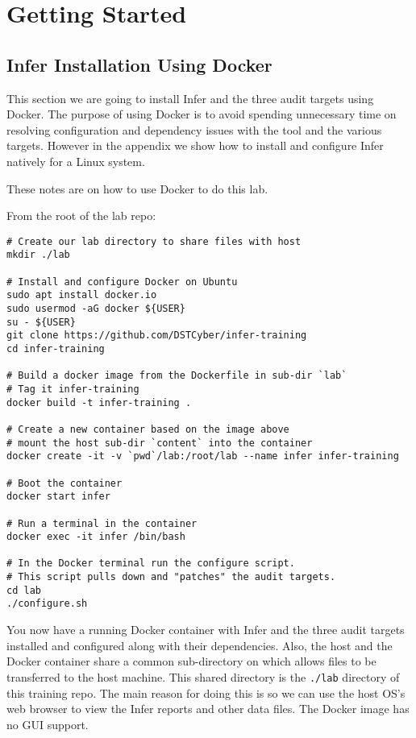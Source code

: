 \section{Getting Started}

\subsection{Infer Installation Using Docker}

This section we are going to install Infer and the three audit targets
using Docker.
The purpose of using Docker is to avoid spending unnecessary time 
on resolving configuration and dependency issues with the tool and 
the various targets.
However in the appendix we show how to install and configure Infer 
natively for a Linux system.

These notes are on how to use Docker to do this lab. 



\noindent From the root of the lab repo: 

\begin{verbatim}
# Create our lab directory to share files with host
mkdir ./lab

# Install and configure Docker on Ubuntu
sudo apt install docker.io
sudo usermod -aG docker ${USER}
su - ${USER}
git clone https://github.com/DSTCyber/infer-training
cd infer-training

# Build a docker image from the Dockerfile in sub-dir `lab`
# Tag it infer-training 
docker build -t infer-training .

# Create a new container based on the image above 
# mount the host sub-dir `content` into the container 
docker create -it -v `pwd`/lab:/root/lab --name infer infer-training

# Boot the container
docker start infer

# Run a terminal in the container
docker exec -it infer /bin/bash

# In the Docker terminal run the configure script.
# This script pulls down and "patches" the audit targets.
cd lab
./configure.sh
\end{verbatim}

You now have a running Docker container with Infer and the three audit targets
installed and configured along with their dependencies. 
Also, the host and the Docker container share a common sub-directory on
which allows files to be transferred to the host machine.
This shared directory is the \verb|./lab| directory of this training repo. 
The main reason for doing this is so we can use the host OS's web browser
to view the Infer reports and other data files.
The Docker image has no GUI support.

